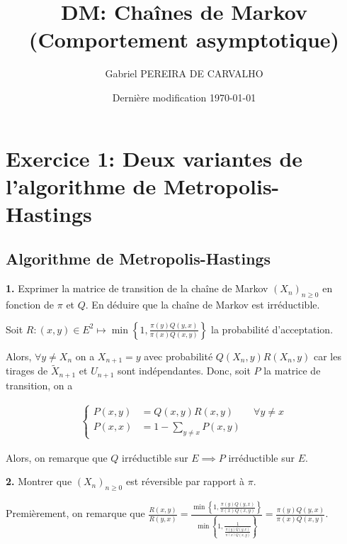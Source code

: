 \documentclass[french]{article}
\begin{document}
	\title{DM: Chaînes de Markov (Comportement asymptotique)}
	\author{Gabriel PEREIRA DE CARVALHO}
	\date{Dernière modification \today}
	
	\maketitle
	
	\section*{Exercice 1: Deux variantes de l'algorithme de Metropolis-Hastings}
	
	\subsection*{Algorithme de Metropolis-Hastings}
	
	\begin{tcolorbox}[colback=gray!5!white,colframe=gray!75!black]
		\textbf{1.} Exprimer la matrice de transition de la chaîne de Markov $(X_n)_{n \geq 0}$ en fonction de $\pi$ et $Q$. En déduire que la chaîne de Markov est irréductible.
	\end{tcolorbox}
	
	Soit $R: (x,y) \in E^2 \mapsto \min\left\{1, \frac{\pi(y) Q(y,x)}{\pi(x) Q(x,y)} \right\}$ la probabilité d'acceptation.
	
	Alors, $\forall y \not= X_n$ on a $X_{n+1} = y$ avec probabilité $Q(X_n, y)R(X_n, y)$ car les tirages de $\tilde{X}_{n+1}$ et $U_{n+1}$ sont indépendantes. Donc, soit $P$ la matrice de transition, on a
	
	\begin{align}
		\begin{cases}
		P(x, y) &= Q(x,y)R(x,y) \qquad \forall y \not=x \\
		P(x, x) &= 1 - \sum_{y \not= x} P(x,y)
		\end{cases}
	\end{align}
		
	 Alors, on remarque que $Q$ irréductible sur $E \implies P$ irréductible sur $E$. 
	
	\begin{tcolorbox}[colback=gray!5!white,colframe=gray!75!black]
		\textbf{2.} Montrer que $(X_n)_{n \geq 0}$ est réversible par rapport à $\pi$.
	\end{tcolorbox}

	Premièrement, on remarque que $\frac{R(x,y)}{R(y,x)} = \frac{\min\left\{1, \frac{\pi(y) Q(y,x)}{\pi(x) Q(x,y)} \right\}}{\min\left\{1, \frac{1}{\frac{\pi(y) Q(y,x)}{\pi(x) Q(x,y)}} \right\}}  = \frac{\pi(y) Q(y,x)}{\pi(x) Q(x, y)}$.
\end{document}
